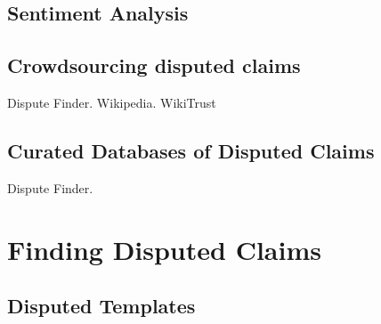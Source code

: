 \documentclass{www2010-submission}
\newcommand{\x}[1]{{\color{blue} #1}\\}
\begin{document}
\subsection{Sentiment Analysis}

\subsection{Crowdsourcing disputed claims}

\x{Dispute Finder. Wikipedia. WikiTrust}

\subsection{Curated Databases of Disputed Claims}

\x{Dispute Finder.}


\section{Finding Disputed Claims}

\subsection{Disputed Templates}
\end{document}
